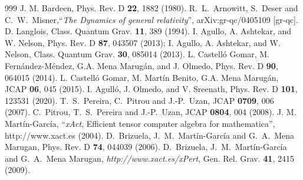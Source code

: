 \documentclass[11pt,tightenlines,eqsecnum,floats,aps,amsmath,amssymb,nofootinbib,prd,floatfix]{revtex4}
\newcommand{\<}{\langle}
\renewcommand{\>}{\rangle}
\begin{document}
\begin{thebibliography}{999}
  J. M. Bardeen, %
  Phys. Rev. D {\bf 22}, 1882 (1980).
  R.~L.~Arnowitt, S.~Deser and C.~W.~Misner,``\textit{The Dynamics of general relativity}'',
  arXiv:gr-qc/0405109 [gr-qc].
  D. Langlois, %
    Class. Quantum Grav. {\bf 11}, 389 (1994).
  I. Agullo, A. Ashtekar, and W. Nelson, %
  Phys. Rev. D {\bf 87}, 043507 (2013);
  I. Agullo, A. Ashtekar, and W. Nelson, %
  Class. Quantum Grav. {\bf 30}, 085014 (2013).
  L. Castell\'o Gomar, M. Fern\'andez-M\'endez, G.A. Mena Marug\'an, and J. Olmedo, %
  Phys. Rev. D {\bf 90}, 064015 (2014).
  L. Castell\'o Gomar, M. Mart\'in Benito, G.A. Mena Marug\'an, %
  JCAP {\bf 06}, 045 (2015).
%
  I. Agull\'o, J. Olmedo, and V. Sreenath, 
  Phys. Rev. D {\bf 101}, 123531 (2020).
%
	T.\ S.\ Pereira, C.\ Pitrou and J.-P.\ Uzan, 
	JCAP {\bf 0709}, 006 (2007).
%
	C.\ Pitrou, T.\ S.\ Pereira and J.-P.\ Uzan, 
	JCAP {\bf 0804}, 004 (2008).
%        
	J. M. Mart\'in-Garc\'ia, ``\textit{xAct}, Efficient tensor computer algebra for mathematica'', 
	http://www.xact.es (2004).
	D.\ Brizuela, J.\ M.\ Mart\'in-Garc\'ia and G.\ A.\ Mena Marugan, 
	Phys. Rev. D {\bf 74}, 044039 (2006).
	D.\ Brizuela, J.\ M.\ Mart\'in-Garc\'ia and G.\ A.\ Mena Marugan, 
	{\it http://www.xact.es/xPert}, Gen. Rel. Grav. {\bf 41}, 2415 (2009).


\end{thebibliography}
\end{document}
